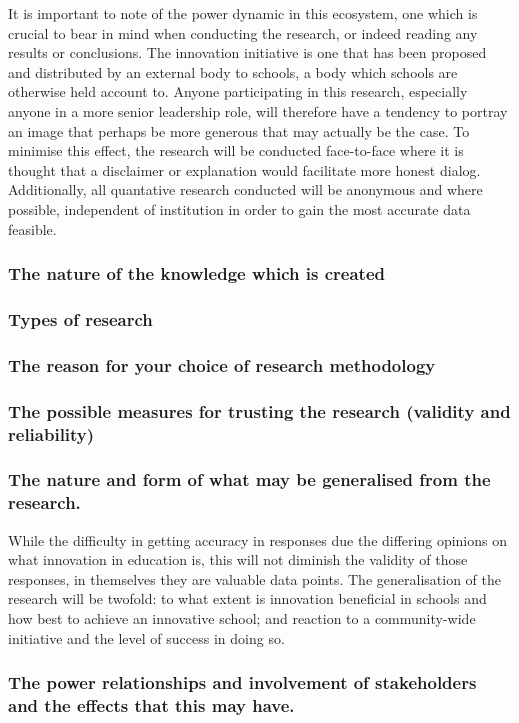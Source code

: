 It is important to note of the power dynamic in this ecosystem, one which is crucial to bear in mind when conducting the research, or indeed reading any results or conclusions. The innovation initiative is one that has been proposed and distributed by an external body to schools, a body which schools are otherwise held account to. Anyone participating in this research, especially anyone in a more senior leadership role, will therefore have a tendency to portray an image that perhaps be more generous that may actually be the case. To minimise this effect, the research will be conducted face-to-face where it is thought that a disclaimer or explanation would facilitate more honest dialog. Additionally, all quantative research conducted will be anonymous and where possible, independent of institution in order to gain the most accurate data feasible.

\subsubsection{The nature of the knowledge which is created}
\subsubsection{Types of research}
\subsubsection{The reason for your choice of research methodology}
\subsubsection{The possible measures for trusting the research (validity and reliability)}
\subsubsection{The nature and form of what may be generalised from the research.}

While the difficulty in getting accuracy in responses due the differing opinions on what innovation in education is, this will not diminish the validity of those responses, in themselves they are valuable data points. The generalisation of the research will be twofold: to what extent is innovation beneficial in schools and how best to achieve an innovative school; and reaction to a community-wide initiative and the level of success in doing so.

\subsubsection{The power relationships and involvement of stakeholders and the effects that this may have.}

